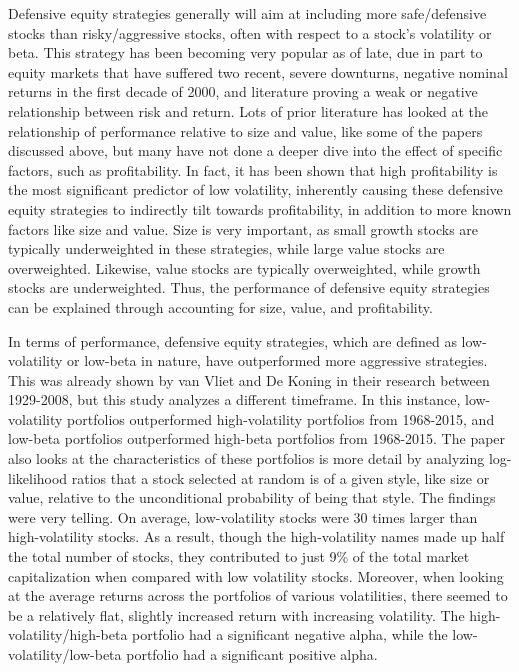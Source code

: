 \documentclass[12pt,twoside]{reedthesis}
\theoremstyle{definition}
\theoremstyle{definition}
\theoremstyle{definition}
\theoremstyle{remark}
\begin{document}
Defensive equity strategies generally will aim at including more
safe/defensive stocks than risky/aggressive stocks, often with respect
to a stock's volatility or beta. This strategy has been becoming very
popular as of late, due in part to equity markets that have suffered two
recent, severe downturns, negative nominal returns in the first decade
of 2000, and literature proving a weak or negative relationship between
risk and return. Lots of prior literature has looked at the relationship
of performance relative to size and value, like some of the papers
discussed above, but many have not done a deeper dive into the effect of
specific factors, such as profitability. In fact, it has been shown that
high profitability is the most significant predictor of low volatility,
inherently causing these defensive equity strategies to indirectly tilt
towards profitability, in addition to more known factors like size and
value. Size is very important, as small growth stocks are typically
underweighted in these strategies, while large value stocks are
overweighted. Likewise, value stocks are typically overweighted, while
growth stocks are underweighted. Thus, the performance of defensive
equity strategies can be explained through accounting for size, value,
and profitability.

In terms of performance, defensive equity strategies, which are defined
as low-volatility or low-beta in nature, have outperformed more
aggressive strategies. This was already shown by van Vliet and De Koning
in their research between 1929-2008, but this study analyzes a different
timeframe. In this instance, low-volatility portfolios outperformed
high-volatility portfolios from 1968-2015, and low-beta portfolios
outperformed high-beta portfolios from 1968-2015. The paper also looks
at the characteristics of these portfolios is more detail by analyzing
log-likelihood ratios that a stock selected at random is of a given
style, like size or value, relative to the unconditional probability of
being that style. The findings were very telling. On average,
low-volatility stocks were 30 times larger than high-volatility stocks.
As a result, though the high-volatility names made up half the total
number of stocks, they contributed to just 9\% of the total market
capitalization when compared with low volatility stocks. Moreover, when
looking at the average returns across the portfolios of various
volatilities, there seemed to be a relatively flat, slightly increased
return with increasing volatility. The high-volatility/high-beta
portfolio had a significant negative alpha, while the
low-volatility/low-beta portfolio had a significant positive alpha.
\end{document}
